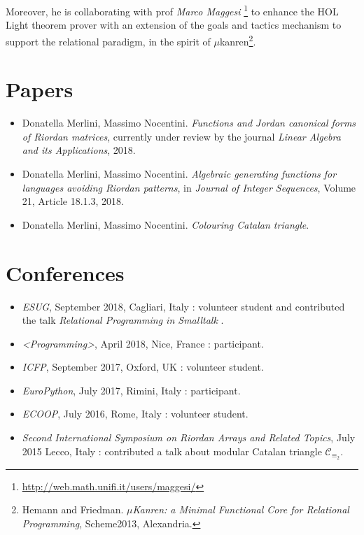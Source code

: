 \documentclass[a4paper]{tufte-handout}
\begin{document}
    Moreover, he is collaborating with prof \textit{Marco Maggesi}
    \footnote{\url{http://web.math.unifi.it/users/maggesi/}} to enhance the HOL
    Light theorem prover with an extension of the goals and tactics mechanism
    to support the relational paradigm, in the spirit of
    $\mu$kanren\footnote{Hemann and Friedman. \textit{$\mu$Kanren: a Minimal Functional
    Core for Relational Programming}, Scheme2013, Alexandria.}.

    \section{Papers}

    \begin{itemize}

        \item Donatella Merlini, Massimo Nocentini. \emph{Functions and Jordan canonical forms of Riordan matrices},
        currently under review by the journal \textit{Linear Algebra and its Applications}, 2018.

        \item Donatella Merlini, Massimo Nocentini. \emph{Algebraic generating functions for languages
            avoiding Riordan patterns}, in \textit{Journal of Integer Sequences}, Volume 21, Article 18.1.3, 2018.

        \item Donatella Merlini, Massimo Nocentini. \emph{Colouring Catalan triangle}.

    \end{itemize}
    
    \section{Conferences}

    \begin{itemize}
        \item \emph{ESUG}, September 2018, Cagliari, Italy : volunteer student and
        contributed the talk \textit{Relational Programming in Smalltalk} .
        \item \emph{<Programming>}, April 2018, Nice, France : participant.
        \item \emph{ICFP}, September 2017, Oxford, UK : volunteer student.
        \item \emph{EuroPython}, July 2017, Rimini, Italy : participant.
        \item \emph{ECOOP}, July 2016, Rome, Italy : volunteer student.
        \item \emph{Second International Symposium on Riordan Arrays and Related Topics}, 
            July 2015 Lecco, Italy : contributed a talk about modular Catalan triangle $\mathcal{C}_{\equiv_{2}}$.
    \end{itemize}
\end{document}
